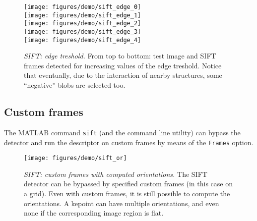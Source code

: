 \documentclass[9.5pt]{article}
\newcommand{\cmd}  [1]{{\color{red}\tt   #1}}
\newcommand{\param}[1]{{\color{red}\tt   #1}}
\begin{document}
\begin{figure}[h]
\begin{center}
\texttt{[image: figures/demo/sift\_edge\_0]}\\
\texttt{[image: figures/demo/sift\_edge\_1]}\\
\texttt{[image: figures/demo/sift\_edge\_2]}\\
\texttt{[image: figures/demo/sift\_edge\_3]}\\
\texttt{[image: figures/demo/sift\_edge\_4]}
\end{center}
\caption{{\em SIFT: edge treshold.} From top to bottom: test image and
  SIFT frames detected for increasing values of the edge
  treshold. Notice that eventually, due to the interaction of nearby
  structures, some ``negative'' blobs are selected too.}
\label{fig:sift-edge-tresh}
\end{figure}

\subsection{Custom frames}\label{sift.custom}

The MATLAB command \cmd{sift} (and the command line utility) can
bypass the detector and run the descriptor on custom frames by means
of the \param{Frames} option.

\begin{figure}[t]
\begin{center}
\texttt{[image: figures/demo/sift\_or]}
\end{center}
\caption{{\em SIFT: custom frames with computed orientations.}  The
  SIFT detector can be bypassed by specified custom frames (in this
  case on a grid).  Even with custom frames, it is still possible to
  compute the orientations. A kepoint can have multiple orientations,
  and even none if the corresponding image region is flat.  }
\label{fig:sift-custom-or}
\end{figure}
\end{document}
